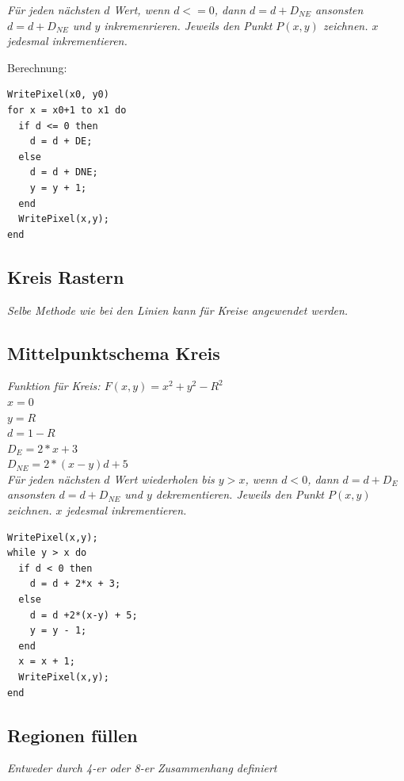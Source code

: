 \textit{
    Für jeden nächsten $d$ Wert, wenn $d <= 0$,
    dann $d = d + D_{NE}$ ansonsten $d = d + D_{NE}$ und $y$ inkremenrieren.
    Jeweils den Punkt $P(x,y)$ zeichnen. $x$ jedesmal inkrementieren.
}

Berechnung:
\begin{lstlisting}
WritePixel(x0, y0)
for x = x0+1 to x1 do
  if d <= 0 then
    d = d + DE;
  else
    d = d + DNE;
    y = y + 1;
  end
  WritePixel(x,y);
end
\end{lstlisting}

\subsection{Kreis Rastern}

\textit{Selbe Methode wie bei den Linien kann für Kreise angewendet werden.}

\subsection{Mittelpunktschema Kreis}

\textit{Funktion für Kreis: $F(x,y) = x^2 + y^2 - R^2$}\\

$x = 0$\\
$y = R$\\
$d = 1 - R$\\
$D_{E} = 2*x + 3$\\
$D_{NE} = 2*(x-y)d + 5$\\

\textit{
    Für jeden nächsten $d$ Wert wiederholen bis $y > x$, wenn $d < 0$,
    dann $d = d + D_{E}$ ansonsten $d = d + D_{NE}$ und $y$ dekrementieren.
    Jeweils den Punkt $P(x,y)$ zeichnen. $x$ jedesmal inkrementieren.
}

\begin{lstlisting}
WritePixel(x,y);
while y > x do
  if d < 0 then
    d = d + 2*x + 3;
  else
    d = d +2*(x-y) + 5;
    y = y - 1;
  end
  x = x + 1;
  WritePixel(x,y);
end
\end{lstlisting}

\subsection{Regionen füllen}

\textit{Entweder durch 4-er oder 8-er Zusammenhang definiert}

